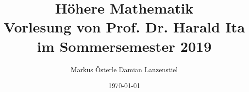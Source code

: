 \documentclass[titlepage,11pt,a4paper,ngerman]{report}
\begin{document}
\title{
	{\Huge Höhere Mathematik}\\[1em]
	{\Large Vorlesung von Prof. Dr. Harald Ita im Sommersemester 2019}}
\author{Markus Österle \hspace{5pt} Damian Lanzenstiel}
\date{ \today}
\maketitle
\tableofcontents




%
%
\end{document}
